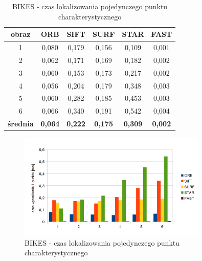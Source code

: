 \begin{table}[htbp]
  \centering
  \caption{BIKES - czas lokalizowania pojedynczego punktu charakterystycznego}
    \begin{tabular}{|c|c|c|c|c|c|}
    \hline
    obraz & \textbf{ORB} & \textbf{SIFT} & \textbf{SURF} & \textbf{STAR} & \textbf{FAST} \\
    \hline
   
    1 & 0,080 & 0,179 & 0,156 & 0,109 & 0,001 \\
    2 & 0,062 & 0,171 & 0,169 & 0,182 & 0,002 \\
    3 & 0,060 & 0,153 & 0,173 & 0,217 & 0,002 \\
    4 & 0,056 & 0,204 & 0,179 & 0,348 & 0,003 \\
    5 & 0,060 & 0,282 & 0,185 & 0,453 & 0,003 \\
    6 & 0,066 & 0,340 & 0,191 & 0,542 & 0,004 \\\hline
    \textbf{średnia} & \textbf{0,064} & \textbf{0,222} & \textbf{0,175} & \textbf{0,309} & \textbf{0,002} \\
   \hline
    \end{tabular}%
  \label{tab:bikes_f2}%
\end{table}%


\begin{figure}
\centering
\includegraphics[width=0.8\textwidth]{pict/mikolajczyk/bikes/f2.png}
\caption{BIKES - czas lokalizowania pojedynczego punktu charakterystycznego}
\end{figure}

